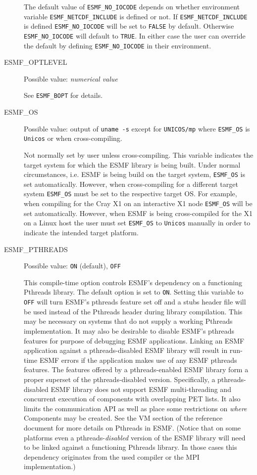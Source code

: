 \begin{description}
The default value of {\tt ESMF\_NO\_IOCODE} depends on whether environment variable {\tt ESMF\_NETCDF\_INCLUDE} is defined or not. If {\tt ESMF\_NETCDF\_INCLUDE} is defined {\tt ESMF\_NO\_IOCODE} will be set
to {\tt FALSE} by default. Otherwise {\tt ESMF\_NO\_IOCODE} will default
to {\tt TRUE}. In either case the user can override the default by defining
{\tt ESMF\_NO\_IOCODE} in their environment.

\item[ESMF\_OPTLEVEL] 
Possible value: {\em numerical value}

See {\tt ESMF\_BOPT} for details.

\item[ESMF\_OS]
Possible value: output of {\tt uname -s} except for {\tt UNICOS/mp} where
{\tt ESMF\_OS} is {\tt Unicos} or when cross-compiling.

Not normally set by user unless cross-compiling. This variable indicates the
target system for which the ESMF library is being built. Under normal
circumstances, i.e. ESMF is being build on the target system, {\tt ESMF\_OS} is
set automatically. However, when cross-compiling for a different target system
{\tt ESMF\_OS} must be set to the respective target OS. For example, when
compiling for the Cray X1 on an interactive X1 node {\tt ESMF\_OS} will be set
automatically. However, when ESMF is being cross-compiled for the X1 on a Linux
host the user must set {\tt ESMF\_OS} to {\tt Unicos} manually in order to
indicate the intended target platform.

\item[ESMF\_PTHREADS]
Possible value: {\tt ON} (default), {\tt OFF}

This compile-time option controls ESMF's dependency on a functioning
Pthreads library. The default option is set to {\tt ON}. Setting this
variable to {\tt OFF} will turn ESMF's pthreads feature set off and a
stubs header file will be used instead of the Pthreads header during
library compilation. This may be necessary on systems that do not
supply a working Pthreads implementation. It may also be desirable to
disable ESMF's pthreads features for purpose of debugging ESMF
applications. Linking an ESMF application against a pthreads-disabled
ESMF library will result in run-time ESMF errors if the application
makes use of any ESMF pthreads features. The features offered by a
pthreads-enabled ESMF library form a proper superset of the
pthreads-disabled version. Specifically, a pthreads-disabled ESMF
library does not support ESMF multi-threading and concurrent execution
of components with overlapping PET lists. It also limits the
communication API as well as place some restrictions on {\em where}
Components may be created. See the VM section of the reference
document for more details on Pthreads in ESMF. (Notice that on some
platforms even a pthreads-{\em disabled} version of the ESMF library
will need to be linked against a functioning Pthreads library. In
those cases this dependency originates from the used compiler or the
MPI implementation.)


\end{description}

